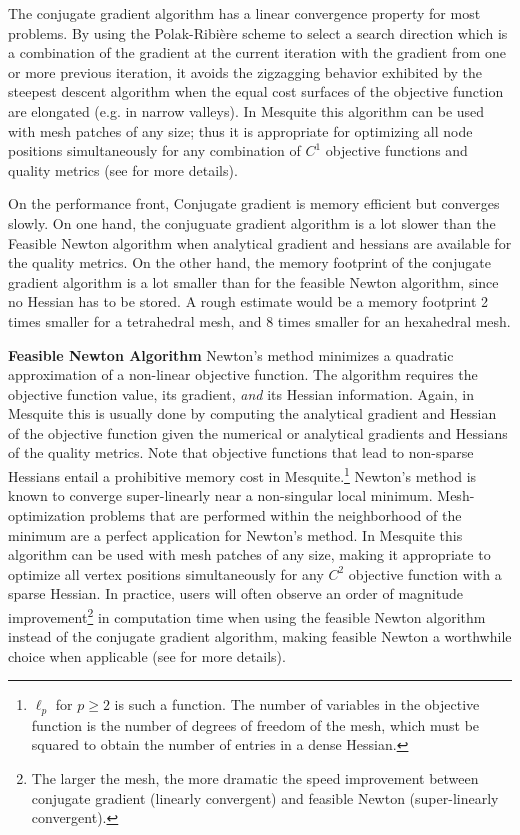 The conjugate gradient algorithm
has a linear convergence property for most problems. By using the
Polak-Ribi\`ere scheme to select a search direction which is a
combination of the gradient at the current iteration with the gradient
from one or more previous iteration, it avoids the zigzagging behavior
exhibited by the steepest descent algorithm when the equal cost
surfaces of the objective function are elongated (e.g. in narrow
valleys). In Mesquite this algorithm can be used with mesh patches of
any size; thus it is appropriate for optimizing all node positions 
simultaneously for any combination of $C^1$ objective functions and
quality metrics (see \cite{FeasNewt} for more details). 

On the performance front, Conjugate gradient is memory efficient but converges slowly.
On one hand, the conjuguate gradient algorithm is a lot slower than the Feasible Newton algorithm
when analytical gradient and hessians are available for the quality metrics. On the other hand, the
memory footprint of the conjugate gradient algorithm is a lot smaller than for the feasible Newton 
algorithm, since no Hessian has to be stored. A rough estimate would be a memory 
footprint 2 times smaller for a tetrahedral mesh, and 8 times smaller for an hexahedral mesh.  
\newline

{\bf Feasible Newton Algorithm } \newline
\label{append_feasnewt}
Newton's method minimizes a quadratic
approximation of a non-linear objective function. The algorithm requires
the objective function value, its gradient, \emph{and} its Hessian information.
Again, in Mesquite this
is usually done by computing the analytical gradient and Hessian of
the objective function given the numerical or analytical gradients and
Hessians of the quality metrics.  Note that objective functions that
lead to non-sparse Hessians entail a prohibitive memory cost in
Mesquite.\footnote{$\ell_p$ for $p \geq 2$ is such a function. The
number of variables in the objective function is the number of degrees
of freedom of the mesh, which must be squared to obtain the number of
entries in a dense Hessian.}  Newton's method is known to converge
super-linearly near a non-singular local minimum.   
Mesh-optimization problems that are performed within the neighborhood of
the minimum are a perfect application for Newton's method. In
Mesquite this algorithm can be used with mesh patches of any size,
making it appropriate to optimize all vertex positions simultaneously
for any $C^2$ objective function with a sparse Hessian.  In practice,
users will often observe an order of magnitude improvement\footnote{The larger the mesh, the
more dramatic the speed improvement between conjugate gradient (linearly convergent) and feasible
Newton (super-linearly convergent).} in
computation time when using the feasible Newton algorithm instead of
the conjugate gradient algorithm, making feasible Newton a worthwhile
choice when applicable (see \cite{FeasNewt} for more details). \newline

